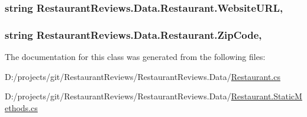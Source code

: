 \subsubsection[{\texorpdfstring{Website\+U\+RL}{WebsiteURL}}]{\setlength{\rightskip}{0pt plus 5cm}string Restaurant\+Reviews.\+Data.\+Restaurant.\+Website\+U\+RL\hspace{0.3cm}{\ttfamily [get]}, {\ttfamily [set]}}\hypertarget{class_restaurant_reviews_1_1_data_1_1_restaurant_a35b157e2ae4d789b591ad0f144b7f883}{}\label{class_restaurant_reviews_1_1_data_1_1_restaurant_a35b157e2ae4d789b591ad0f144b7f883}
\subsubsection[{\texorpdfstring{Zip\+Code}{ZipCode}}]{\setlength{\rightskip}{0pt plus 5cm}string Restaurant\+Reviews.\+Data.\+Restaurant.\+Zip\+Code\hspace{0.3cm}{\ttfamily [get]}, {\ttfamily [set]}}\hypertarget{class_restaurant_reviews_1_1_data_1_1_restaurant_a96e74386625c8b6568b3af124ff6b189}{}\label{class_restaurant_reviews_1_1_data_1_1_restaurant_a96e74386625c8b6568b3af124ff6b189}


The documentation for this class was generated from the following files\+:\begin{DoxyCompactItemize}
\item 
D\+:/projects/git/\+Restaurant\+Reviews/\+Restaurant\+Reviews.\+Data/\hyperlink{_restaurant_8cs}{Restaurant.\+cs}\item 
D\+:/projects/git/\+Restaurant\+Reviews/\+Restaurant\+Reviews.\+Data/\hyperlink{_restaurant_8_static_methods_8cs}{Restaurant.\+Static\+Methods.\+cs}\end{DoxyCompactItemize}
